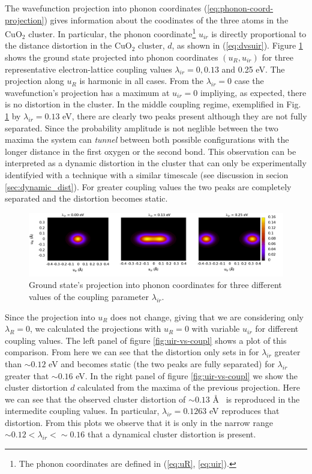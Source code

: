 The wavefunction projection into phonon coordinates (\ref{eq:phonon-coord-projection}) gives information about the coodinates of the three atoms in the CuO$_2$ cluster.
In particular, the phonon coordinate\footnote{The phonon coordinates are  defined in (\ref{eq:uR}, \ref{eq:uir}).} $u_{ir}$ is directly proportional to the distance distortion in the CuO$_2$ cluster, $d$, as shown in (\ref{eq:dvsuir}).
Figure \ref{fig:ph-ground} shows the ground state projected into phonon coordinates $(u_R,u_{ir})$ for three representative electron-lattice coupling values $\lambda_{ir}=0, 0.13$ and 0.25 eV.
The projection along $u_R$ is harmonic in all cases.
From the $\lambda_{ir}=0$ case the wavefunction's projection has a maximum at $u_{ir}=0$ impliying, as expected, there is no distortion in the cluster.
In the middle coupling regime, exemplified in Fig. \ref{fig:ph-ground} by $\lambda_{ir}=0.13$ eV, there are clearly two peaks present although they are not fully separated.
Since the probability amplitude is not neglible between the two maxima the system can \textit{tunnel} between both possible configurations with the longer distance in the first oxygen or the second bond.
This observation can be interpreted as a dynamic distortion in the cluster that can only be experimentally identifyied with a technique with a similar timescale (see discussion in secion \ref{sec:dynamic_dist}). 
For greater coupling values the two peaks are completely separated and the distortion becomes static.

\begin{figure}[ht!]
  \centering
  \includegraphics[width=1.0\textwidth]{images/ph-ground.png}
  \caption{Ground state's projection into phonon coordinates for three different values of the coupling parameter $\lambda_{ir}$.}
  \label{fig:ph-ground}
\end{figure}

Since the projection into $u_R$ does not change, giving that we are considering only $\lambda_R=0$, we calculated the projections with $u_R=0$ with variable $u_{ir}$ for different coupling values.
The left panel of figure \ref{fig:uir-vs-coupl} shows a plot of this comparison.
From here we can see that the distortion only sets in for $\lambda_{ir}$ greater than $\sim 0.12$ eV and becomes static (the two peaks are fully separated) for $\lambda_{ir}$ greater that $\sim 0.16$ eV.
In the right panel of figure \ref{fig:uir-vs-coupl} we show the cluster distortion $d$ calculated from the maxima of the previous projection.
Here we can see that the observed cluster distortion of $\sim 0.13$ \AA\ \cite{MustredeLeon1990} is reproduced in the intermedite coupling values. 
In particular, $\lambda_{ir}=0.1263$ eV reproduces that distortion.
From this plots we observe that it is only in the narrow range  $\sim 0.12 < \lambda_{ir} < \sim 0.16$ that a dynamical cluster distortion is present. 

